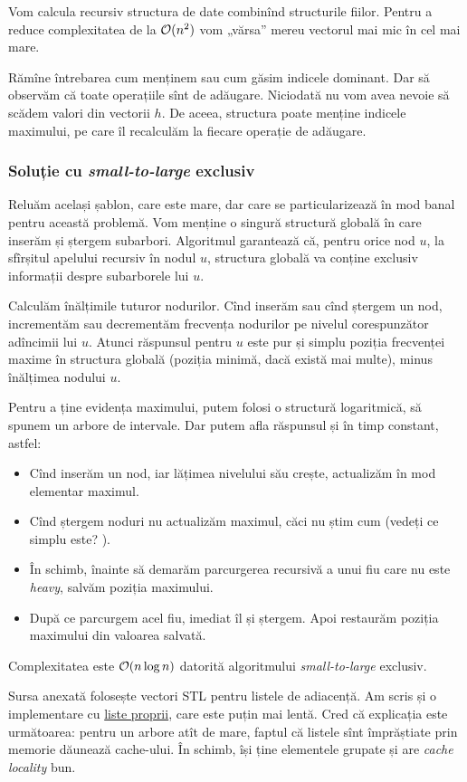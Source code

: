 \documentclass[../main.tex]{subfiles}
\begin{document}
Vom calcula recursiv structura de date combinînd structurile fiilor. Pentru a reduce complexitatea de la $\mathcal{O}(n^2)$ vom „vărsa” mereu vectorul mai mic în cel mai mare.

Rămîne întrebarea cum menținem sau cum găsim indicele dominant. Dar să observăm că toate operațiile sînt de adăugare. Niciodată nu vom avea nevoie să scădem valori din vectorii $h$. De aceea, structura poate menține indicele maximului, pe care îl recalculăm la fiecare operație de adăugare.

\subsubsection*{Soluție cu \textit{small-to-large} exclusiv}

Reluăm același șablon, care este mare, dar care se particularizează în mod banal pentru această problemă. Vom menține o singură structură globală în care inserăm și ștergem subarbori. Algoritmul garantează că, pentru orice nod $u$, la sfîrșitul apelului recursiv în nodul $u$, structura globală va conține exclusiv informații despre subarborele lui $u$.

Calculăm înălțimile tuturor nodurilor. Cînd inserăm sau cînd ștergem un nod, incrementăm sau decrementăm frecvența nodurilor pe nivelul corespunzător adîncimii lui $u$. Atunci răspunsul pentru $u$ este pur și simplu poziția frecvenței maxime în structura globală (poziția minimă, dacă există mai multe), minus înălțimea nodului $u$.

Pentru a ține evidența maximului, putem folosi o structură logaritmică, să spunem un arbore de intervale. Dar putem afla răspunsul și în timp constant, astfel:

\begin{itemize}
  \item Cînd inserăm un nod, iar lățimea nivelului său crește, actualizăm în mod elementar maximul.

  \item Cînd ștergem noduri nu actualizăm maximul, căci nu știm cum (vedeți ce simplu este? ).

  \item În schimb, înainte să demarăm parcurgerea recursivă a unui fiu care nu este \textit{heavy}, salvăm poziția maximului.

  \item După ce parcurgem acel fiu, imediat îl și ștergem. Apoi restaurăm poziția maximului din valoarea salvată.
\end{itemize}

Complexitatea este $\mathcal{O}(n \log n)$ datorită algoritmului \textit{small-to-large} exclusiv.

Sursa anexată folosește vectori STL pentru listele de adiacență. Am scris și o implementare cu \href{https://codeforces.com/contest/1009/submission/357104295}{liste proprii}, care este puțin mai lentă. Cred că explicația este următoarea: pentru un arbore atît de mare, faptul că listele sînt împrăștiate prin memorie dăunează cache-ului. În schimb,  își ține elementele grupate și are \textit{cache locality} bun.
\end{document}
